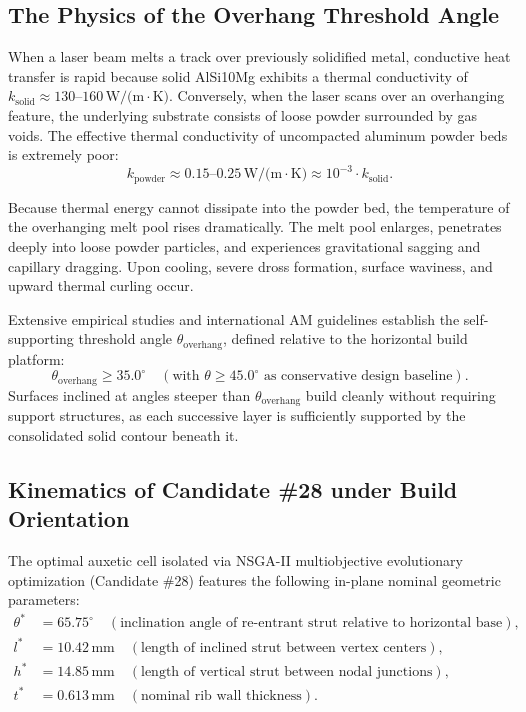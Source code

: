 \subsection{The Physics of the Overhang Threshold Angle}
When a laser beam melts a track over previously solidified metal, conductive heat transfer is rapid because solid AlSi10Mg exhibits a thermal conductivity of $k_{\text{solid}} \approx 130\text{--}160\,\text{W/(m}\cdot\text{K)}$. Conversely, when the laser scans over an overhanging feature, the underlying substrate consists of loose powder surrounded by gas voids. The effective thermal conductivity of uncompacted aluminum powder beds is extremely poor:
\begin{equation}
k_{\text{powder}} \approx 0.15\text{--}0.25\,\text{W/(m}\cdot\text{K)} \approx 10^{-3} \cdot k_{\text{solid}}.
\label{eq:thermal_conductivity_ratio}
\end{equation}

Because thermal energy cannot dissipate into the powder bed, the temperature of the overhanging melt pool rises dramatically. The melt pool enlarges, penetrates deeply into loose powder particles, and experiences gravitational sagging and capillary dragging. Upon cooling, severe dross formation, surface waviness, and upward thermal curling occur.

Extensive empirical studies and international AM guidelines establish the self-supporting threshold angle $\theta_{\text{overhang}}$, defined relative to the horizontal build platform:
\begin{equation}
\theta_{\text{overhang}} \ge 35.0^\circ \quad (\text{with } \theta \ge 45.0^\circ \text{ as conservative design baseline}).
\label{eq:overhang_threshold}
\end{equation}
Surfaces inclined at angles steeper than $\theta_{\text{overhang}}$ build cleanly without requiring support structures, as each successive layer is sufficiently supported by the consolidated solid contour beneath it.

\subsection{Kinematics of Candidate \#28 under Build Orientation}
The optimal auxetic cell isolated via NSGA-II multiobjective evolutionary optimization (Candidate \#28) features the following in-plane nominal geometric parameters:
\begin{align}
\theta^* &= 65.75^\circ \quad (\text{inclination angle of re-entrant strut relative to horizontal base}), \\
l^* &= 10.42\,\text{mm} \quad (\text{length of inclined strut between vertex centers}), \\
h^* &= 14.85\,\text{mm} \quad (\text{length of vertical strut between nodal junctions}), \\
t^* &= 0.613\,\text{mm} \quad (\text{nominal rib wall thickness}).
\end{align}

